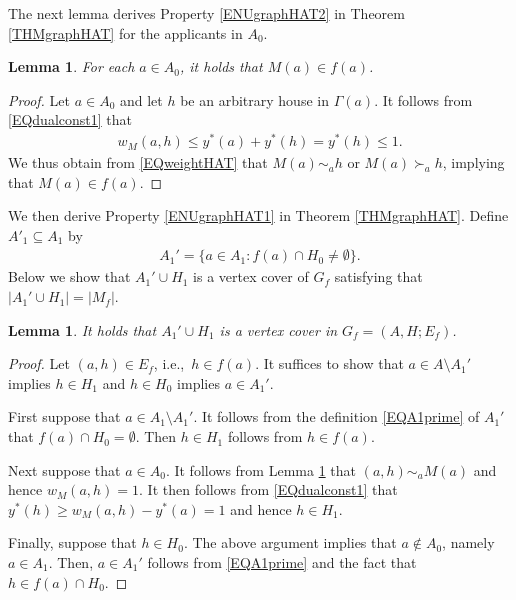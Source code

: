 \documentclass[11pt,a4paper,showkeys]{article}
\theoremstyle{plain}
\newtheorem{lemma}[theorem]{Lemma}
\theoremstyle{definition}
\begin{document}
The next lemma derives Property \ref{ENUgraphHAT2} in Theorem \ref{THMgraphHAT} 
for the applicants in $A_0$. 

\begin{lemma}
    \label{LEMA0}
    For each $a\in A_0$, 
    it holds that $M(a)\in f(a)$. 
\end{lemma}

\begin{proof}
Let $a\in A_0$ and let $h$ be an arbitrary house in $\Gamma(a)$. 
It follows from \eqref{EQdualconst1} that 
\begin{align*}
    w_M(a,h) \le y^*(a)+y^*(h)=y^*(h)\le 1.
\end{align*} 
We thus obtain from \eqref{EQweightHAT} that 
$M(a)\sim_a h$ or $M(a)\succ_a h$, 
implying that $M(a)\in f(a)$. 
\end{proof}

We then derive Property \ref{ENUgraphHAT1} in Theorem \ref{THMgraphHAT}. 
Define  $A'_1\subseteq A_1$ 
by 
\begin{align}
    A_1' = \{a\in A_1 \colon f(a) \cap H_0 \neq \emptyset\}.
    \label{EQA1prime}
\end{align}
Below we show that $A_1' \cup H_1$ is a vertex cover of $G_f$ satisfying that 
$|A_1' \cup H_1|=|M_f|$. 

\begin{lemma}
\label{LEMcover}
    It holds that $A_1' \cup H_1$ is a vertex cover in $G_f=(A,H;E_f)$. 
\end{lemma}

\begin{proof}
    Let $(a,h)\in E_f$, i.e.,\ $h\in f(a)$. 
    It suffices to show that $a\in  A\setminus A_1'$ implies $h\in H_1$ and 
    $h\in H_0$ implies $a\in A_1'$. 

    First 
    suppose that $a\in A_1\setminus A_1'$. 
    It follows from the definition \eqref{EQA1prime} of $A_1'$ that 
    $f(a)\cap H_0=\emptyset$. 
    Then $h\in H_1$ follows from $h\in f(a)$. 

    Next 
    suppose that $a \in A_0$. 
    It follows from Lemma \ref{LEMA0} that $(a,h) \sim_a M(a)$ and hence  $w_M(a,h)=1$. 
    It then follows from \eqref{EQdualconst1} that $y^*(h) \ge w_M(a,h)-y^*(a)=1$ and hence $h\in H_1$. 

    Finally, 
    suppose that $h\in H_0$. 
    The above argument implies that $a\not\in A_0$, namely $a\in A_1$. 
    Then, 
    $a\in A_1'$ follows from 
    \eqref{EQA1prime} and 
    the fact that 
    $h\in f(a) \cap H_0$. 
\end{proof}
\end{document}
